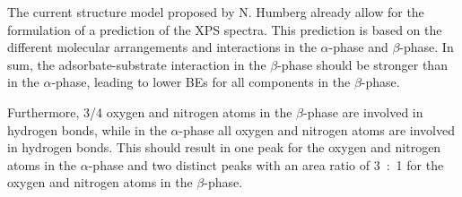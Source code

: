 The current structure model proposed by N. Humberg\autocite{Humberg2020,Humberg2024} already allow for the formulation of a prediction of the \ac{XPS} spectra. This prediction is based on the different molecular arrangements and interactions in the $\alpha$-phase and $\beta$-phase. In sum, the adsorbate-substrate interaction in the $\beta$-phase should be stronger than in the $\alpha$-phase, leading to lower \acp{BE} for all components in the $\beta$-phase.

Furthermore, 3/4 oxygen and nitrogen atoms in the $\beta$-phase are involved in hydrogen bonds, while in the $\alpha$-phase all oxygen and nitrogen atoms are involved in hydrogen bonds. This should result in one peak for the oxygen and nitrogen atoms in the $\alpha$-phase and two distinct peaks with an area ratio of 3~:~1 for the oxygen and nitrogen atoms in the $\beta$-phase.

\cleardoublepage